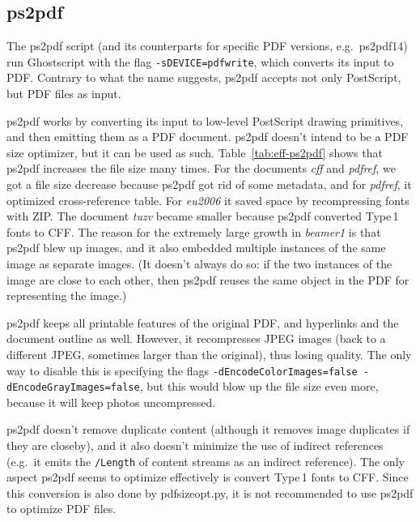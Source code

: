 \documentclass{ltugproc}
\def\cmd{\textsf}
\begin{document}
\subsection{ps2pdf}

The \cmd{ps2pdf} \cite{ps2pdf} script (and its counterparts for specific PDF
versions, e.g.\ \cmd{ps2pdf14}) run Ghostscript with the flag
\texttt{-sDEVICE=pdfwrite}, which converts its input to PDF. Contrary to
what the name suggests, \cmd{ps2pdf} accepts not only PostScript, but PDF
files as input.

\cmd{ps2pdf} works by converting its input to low-level PostScript drawing
primitives, and then emitting them as a PDF document. \cmd{ps2pdf} doesn't
intend to be a PDF size optimizer, but it can be used as such.
Table~\ref{tab:eff-ps2pdf} shows that \cmd{ps2pdf} increases the file size
many times. For the documents \emph{cff} and \emph{pdfref}, we got a file
size decrease because \cmd{ps2pdf} got rid of some metadata, and for
\emph{pdfref}, it optimized cross-reference table. For \emph{eu2006} it
saved space by recompressing fonts with ZIP. The document \emph{tuzv} became
smaller because \cmd{ps2pdf} converted Type\,1 fonts to CFF. The reason for
the extremely large growth in \emph{beamer1} is that \cmd{ps2pdf} blew up
images, and it also embedded multiple instances of the same image as
separate images. (It doesn't always do so: if the two instances of the image
are close to each other, then \cmd{ps2pdf} reuses the same object in the PDF
for representing the image.)

\cmd{ps2pdf} keeps all printable features of the original PDF, and
hyperlinks and the document outline as well. However, it recompresses JPEG
images (back to a different JPEG, sometimes larger than the original), thus
losing quality. The only way to disable this is specifying the flags
\texttt{-dEncodeColorImages=false -dEncodeGrayImages=false}, but this would
blow up the file size even more, because it will keep photos uncompressed.

\cmd{ps2pdf} doesn't remove duplicate content (although it
removes image duplicates if they are closeby), and it also doesn't minimize
the use of indirect references (e.g.\ it emits the \texttt{/Length} of
content streams as an indirect reference). The only aspect \cmd{ps2pdf}
seems to optimize effectively is convert Type\,1 fonts to CFF. Since this
conversion is also done by \cmd{pdfsizeopt.py}, it is
not recommended to use \cmd{ps2pdf} to optimize PDF files.
\end{document}
